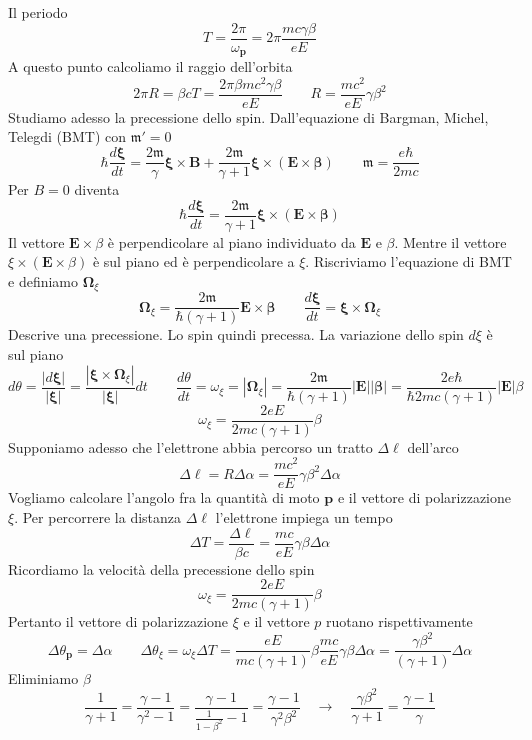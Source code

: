 Il periodo
$$
T = \frac{2\pi}{\omega_{\mathbf{p}}} = 2\pi \frac{mc\gamma\beta}{eE}
$$
A questo punto calcoliamo il raggio dell'orbita
$$
2\pi R = \beta c T = \frac{2\pi \beta m c^2 \gamma \beta}{eE}\qquad R = \frac{mc^2}{eE}\gamma\beta^2
$$
Studiamo adesso la precessione dello spin. Dall'equazione di Bargman, Michel, Telegdi (BMT) con $\mathfrak{m}'=0$
$$
\hbar \frac{d\boldsymbol{\xi}}{dt} = \frac{2\mathfrak{m}}{\gamma} \boldsymbol{\xi} \times \mathbf{B} + \frac{2\mathfrak{m}}{\gamma + 1} \boldsymbol{\xi} \times (\mathbf{E} \times \boldsymbol{\beta})\qquad \mathfrak{m}=\frac{e\hbar}{2mc}
$$
Per $B=0$ diventa
$$
\hbar \frac{d\boldsymbol{\xi}}{dt} = \frac{2\mathfrak{m}}{\gamma + 1} \boldsymbol{\xi} \times (\mathbf{E} \times \boldsymbol{\beta})
$$
Il vettore $\mathbf{E}\times \beta$ è perpendicolare al piano individuato da $\mathbf{E}$ e $\beta$. Mentre il vettore $\xi\times(\mathbf{E}\times \beta)$ è sul piano ed è perpendicolare a $\xi$. Riscriviamo l'equazione di BMT e definiamo $\boldsymbol{\Omega}_\xi$
$$
\boldsymbol{\Omega}_\xi = \frac{2\mathfrak{m}}{\hbar(\gamma + 1)} \mathbf{E} \times \boldsymbol{\beta} \qquad \frac{d\boldsymbol{\xi}}{dt} = \boldsymbol{\xi} \times \boldsymbol{\Omega}_\xi
$$
Descrive una precessione. Lo spin quindi precessa. La variazione dello spin $d\xi$ è sul piano
$$
d\theta = \frac{|d\boldsymbol{\xi}|}{|\boldsymbol{\xi}|} = \frac{|\boldsymbol{\xi} \times \boldsymbol{\Omega}_\xi|}{|\boldsymbol{\xi}|} dt \qquad \frac{d\theta}{dt} = \omega_\xi = |\boldsymbol{\Omega}_\xi| = \frac{2\mathfrak{m}}{\hbar(\gamma + 1)} |\mathbf{E}| |\boldsymbol{\beta}| = \frac{2e\hbar}{\hbar 2mc (\gamma + 1)} |\mathbf{E}| \beta
$$ 
$$
\omega_\xi = \frac{2eE}{2mc(\gamma + 1)} \beta
$$
Supponiamo adesso che l'elettrone abbia percorso un tratto $\Delta \ell$ dell'arco
$$
\Delta\ell = R\Delta\alpha = \frac{mc^2}{eE}\gamma\beta^2\Delta\alpha
$$
Vogliamo calcolare l'angolo fra la quantità di moto $\mathbf{p}$ e il vettore di polarizzazione $\xi$. Per percorrere la distanza $\Delta \ell$ l'elettrone impiega un tempo
$$
\Delta T = \frac{\Delta\ell}{\beta c} = \frac{mc}{eE}\gamma\beta\Delta\alpha
$$
Ricordiamo la velocità della precessione dello spin
$$
\omega_\xi = \frac{2eE}{2mc(\gamma + 1)}\beta
$$
Pertanto il vettore di polarizzazione $\xi$ e il vettore $p$ ruotano rispettivamente
$$
\Delta\theta_{\mathbf{p}} = \Delta\alpha \qquad \Delta\theta_\xi = \omega_\xi\Delta T = \frac{eE}{mc(\gamma + 1)}\beta \frac{mc}{eE}\gamma\beta\Delta\alpha = \frac{\gamma\beta^2}{(\gamma + 1)}\Delta\alpha
$$
Eliminiamo $\beta$
$$
\frac{1}{\gamma + 1} = \frac{\gamma - 1}{\gamma^2 - 1} = \frac{\gamma - 1}{\frac{1}{1 - \beta^2} - 1} = \frac{\gamma - 1}{\gamma^2\beta^2} \quad \to \quad \frac{\gamma\beta^2}{\gamma + 1} = \frac{\gamma - 1}{\gamma}
$$
